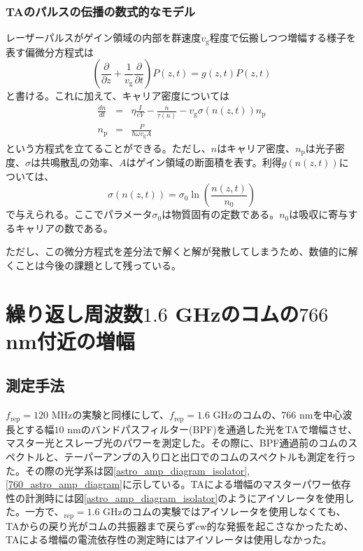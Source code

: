 \documentclass[uplatex, dvipdfmx, a4paper, report, papersize, 11pt]{jsbook}
\begin{document}
\subsubsection{TAのパルスの伝播の数式的なモデル}
レーザーパルスがゲイン領域の内部を群速度$v_\mathrm{g}$程度で伝搬しつつ増幅する様子を表す偏微分方程式は
\begin{equation}
  \left(\frac{\partial}{\partial z} + \frac{1}{v_{\mathrm{g}}}\frac{\partial}{\partial t}\right)P(z,t) = g(z,t)P(z,t)
\end{equation}
と書ける。これに加えて、キャリア密度については
\begin{eqnarray}
  \frac{dn}{dt} &=& \eta \frac{I}{eV} - \frac{n}{\tau(n)}-v_{\mathrm{g}}\sigma(n(z,t))n_{\mathrm{p}}\\
  n_{\mathrm{p}} &=& \frac{P}{\hbar\omega v_{\mathrm{g}}A}
\end{eqnarray}
という方程式を立てることができる。ただし、$n$はキャリア密度、$n_{\mathrm{p}}$は光子密度、$\sigma$は共鳴散乱の効率、$A$はゲイン領域の断面積を表す。利得$g(n(z,t))$については、　
\begin{equation}
  \sigma(n(z,t)) = \sigma_0 \ln{\left( \frac{n(z,t)}{n_0}\right)}
\end{equation}
で与えられる。ここでパラメータ$\sigma_0$は物質固有の定数である。$n_0$は吸収に寄与するキャリアの数である。

ただし、この微分方程式を差分法で解くと解が発散してしまうため、数値的に解くことは今後の課題として残っている。

\section{繰り返し周波数$1.6$ GHzのコムの$766$ nm付近の増幅}
\subsection{測定手法}
$f_{\mathrm{rep}} = 120$ MHzの実験と同様にして、$f_{\mathrm{rep}} = 1.6$ GHzのコムの、$766$ nmを中心波長とする幅$10$ nmのバンドパスフィルター(BPF)を通過した光をTAで増幅させ、マスター光とスレーブ光のパワーを測定した。その際に、BPF通過前のコムのスペクトルと、テーパーアンプの入り口と出口でのコムのスペクトルも測定を行った。その際の光学系は図\ref{astro_amp_diagram_isolator}, \ref{760_astro_amp_diagram}に示している。TAによる増幅のマスターパワー依存性の計測時には図\ref{astro_amp_diagram_isolator}のようにアイソレータを使用した。一方で、$_{\mathrm{rep}} = 1.6$
 GHzのコムの実験ではアイソレータを使用しなくても、TAからの戻り光がコムの共振器まで戻らずcw的な発振を起こさなかったため、TAによる増幅の電流依存性の測定時にはアイソレータは使用しなかった。\\
\end{document}
